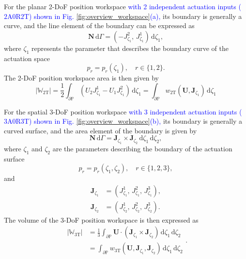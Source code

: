 \documentclass[journal]{IEEEtran}
\theoremstyle{definition}
\begin{document}
For the planar 2-DoF position workspace \textcolor{blue}{with 2 independent actuation inputs ($2\text{A}0\text{R}2\text{T}$) shown in Fig. \ref{fig:overview_workspace}(a),} its boundary is generally a curve, and the line element of the boundary can be expressed as
\begin{equation}
  \mathbf{N}\,\mathrm{d}\Gamma = \left(-J^{2}_{\zeta_1},\,J^{1}_{\zeta_1}\right)\,\mathrm{d}\zeta_1,
\end{equation}
where $\zeta_1$ represents the parameter that describes the boundary curve of the actuation space
\begin{equation}
  p_r = p_r(\zeta_1), \quad r \in \{1, 2\}.
\end{equation}
The 2-DoF position workspace area is then given by
\begin{equation}
    \left|\mathbb{W}_\text{2T}\right| = \frac{1}{2} \int_{\partial \mathbb{P}} \left(U_2 J^{1}_{\zeta_1} - U_1 J^{2}_{\zeta_1}\right) \, \mathrm{d}{\zeta_1} 
    = \int_{\partial \mathbb{P}} w_\text{2T}\left(\mathbf{U}, \mathbf{J}_{\zeta_1}\right) \, \mathrm{d}{\zeta_1}
  \label{eq:position_workspace_2d}
\end{equation}

For the spatial 3-DoF position workspace \textcolor{blue}{with 3 independent actuation inputs ($3\text{A}0\text{R}3\text{T}$) shown in Fig. \ref{fig:overview_workspace}(b),} its boundary is generally a curved surface, and the area element of the boundary is given by
\begin{equation}
  \mathbf{N}\,\mathrm{d}\Gamma = \mathbf{J}_{\zeta_1} \times \mathbf{J}_{\zeta_2}\,\mathrm{d}\zeta_1\,\mathrm{d}\zeta_2,
\end{equation}
where $\zeta_1$ and $\zeta_2$ are the parameters describing the boundary of the actuation surface
\begin{equation}
  p_r = p_r(\zeta_1,\zeta_2), \quad r \in \{1, 2, 3\},
\end{equation}
and
\begin{equation}
  \begin{split}
    \mathbf{J}_{\zeta_1} &= \left(J^{1}_{\zeta_1},\,J^{2}_{\zeta_1},\,J^{3}_{\zeta_1}\right),\\[1mm]
    \mathbf{J}_{\zeta_2} &= \left(J^{1}_{\zeta_2},\,J^{2}_{\zeta_2},\,J^{3}_{\zeta_2}\right).
  \end{split}
\end{equation}
The volume of the 3-DoF position workspace is then expressed as
\begin{equation}
  \begin{split}
    \left|\mathbb{W}_\text{3T}\right| &= \frac{1}{3} \int_{\partial \mathbb{P}} \mathbf{U} \cdot \left(\mathbf{J}_{\zeta_1} \times \mathbf{J}_{\zeta_2}\right) \, \mathrm{d}{\zeta_1}\,\mathrm{d}{\zeta_2}\\
    &= \int_{\partial \mathbb{P}} w_\text{3T}\left(\mathbf{U},\mathbf{J}_{\zeta_1},\mathbf{J}_{\zeta_2}\right) \, \mathrm{d}{\zeta_1}\,\mathrm{d}{\zeta_2}
  \end{split}.
  \label{eq:position_workspace_3d}
\end{equation}
\end{document}
